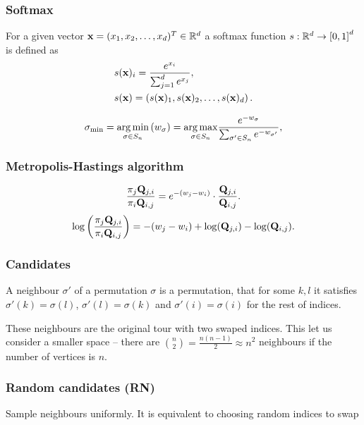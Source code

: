 \begin{frame}
	\frametitle{Softmax}
	\begin{definition}
		For a given vector $\mathbf{x} = (x_1, x_2, \ldots, x_d)^T \in \mathbb{R}^d$ a softmax function $s: \mathbb{R}^d \rightarrow \left[0, 1\right]^d$ is defined as
		\begin{align*}
		&s(\mathbf{x})_i = \frac{e^{x_i}}{\sum_{j=1}^{d} e^{x_j}}, \\
		&s(\mathbf{x}) = \left( s(\mathbf{x})_1, s(\mathbf{x})_2, \ldots, s(\mathbf{x})_d \right).
		\end{align*}
	\end{definition}
	\begin{equation*}
		\sigma_{\min} = \underset{\sigma \in S_n}{\operatorname*{arg\,min}} \left( w_{\sigma} \right) = \underset{\sigma \in S_n}{\operatorname*{arg\,max}} \frac{e^{-w_{\sigma}}}{\sum_{\sigma' \in S_n} e^{-w_{\sigma'}}},
	\end{equation*}
\end{frame}

\begin{frame}
	\frametitle{Metropolis-Hastings algorithm}
	\begin{equation*}
		\frac{\pi_j \mathbf{Q}_{j,i}}{\pi_i \mathbf{Q}_{i,j}} = e^{-(w_j-w_i)} \cdot \frac{\mathbf{Q}_{j,i}}{\mathbf{Q}_{i,j}}.
	\end{equation*}
	\begin{equation*}
		\log \left( \frac{\pi_j \mathbf{Q}_{j,i}}{\pi_i \mathbf{Q}_{i,j}} \right) = -(w_j-w_i) + \log(\mathbf{Q}_{j,i}) - \log(\mathbf{Q}_{i,j}).
	\end{equation*}
\end{frame}

\begin{frame}
	\frametitle{Candidates}
	\begin{definition}
		A neighbour $\sigma'$ of a permutation $\sigma$ is a permutation, that for some $k, l$ it satisfies $\sigma'(k) = \sigma(l)$, $\sigma'(l) = \sigma(k)$ and $\sigma'(i) = \sigma(i)$ for the rest of indices.
	\end{definition}
	These neighbours are the original tour with two swaped indices. This let  us consider a smaller space -- there are $\binom{n}{2} = \frac{n(n-1)}{2} \approx n^2$ neighbours if the number of vertices is $n$.
\end{frame}

\begin{frame}
	\frametitle{Random candidates (RN)}
	Sample neighbours uniformly. It is equivalent to choosing random indices to swap
\end{frame}

